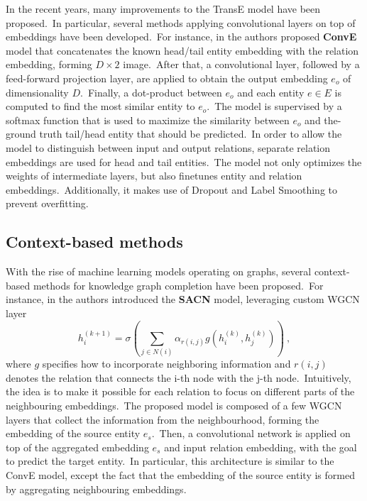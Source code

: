 \documentclass[longabstract, english, mgr]{iithesis}
\theoremstyle{default_theorem_style}\newtheorem{theorem}{Theorem}
\theoremstyle{default_theorem_style}\newtheorem{definition}{Definition}
\begin{document}
\noindent In the recent years, many improvements to the TransE model have been proposed.\ In particular, several
methods applying convolutional layers on top of embeddings have been developed.\ For instance, in \cite{conve_model} the
authors proposed \textbf{ConvE} model that concatenates the known head/tail entity embedding with the relation
embedding, forming $D \times 2$ image.\ After that, a convolutional layer, followed by a feed-forward projection layer,
are applied to obtain the output embedding $e_o$ of dimensionality $D$.\ Finally, a dot-product between $e_o$ and each
entity $e \in E$ is computed to find the most similar entity to $e_o$.\ The model is supervised by a softmax function
that is used to maximize the similarity between $e_o$ and the-ground truth tail/head entity that should be
predicted.\ In order to allow the model to distinguish between input and output relations, separate
relation embeddings are used for head and tail entities.\ The model not only optimizes the weights of intermediate
layers, but also finetunes entity and relation embeddings.\ Additionally, it makes use of Dropout and Label
Smoothing to prevent overfitting.

\subsection{Context-based methods}

With the rise of machine learning models operating on graphs, several context-based methods for knowledge graph
completion have been proposed.\ For instance, in \cite{sacn_model} the authors introduced the \textbf{SACN} model,
leveraging custom WGCN layer
$$
h_i^{(k + 1)} = \sigma(\sum_{j \in N(i)} \alpha_{r(i, j)} g(h_i^{(k)}, h_j^{(k)}))\ ,
$$
where $g$ specifies how to incorporate neighboring information and $r(i, j)$ denotes the relation that connects the i-th
node with the j-th node.\ Intuitively, the idea is to make it possible for each relation to focus on different parts
of the neighbouring embeddings.\ The proposed model is composed of a few WGCN layers that collect the information from
the neighbourhood, forming the embedding of the source entity $e_s$.\ Then, a convolutional network is applied on top of
the aggregated embedding $e_s$ and input relation embedding, with the goal to predict the target entity.\ In particular,
this architecture is similar to the ConvE model, except the fact that the embedding of the source entity is formed by
aggregating neighbouring embeddings.\newline
\end{document}
